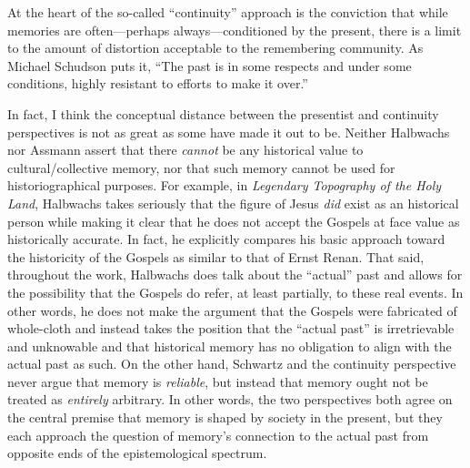 At the heart of the so-called ``continuity'' approach is the conviction
that while memories are often---perhaps always---conditioned by the
present, there is a limit to the amount of distortion acceptable to the
remembering community. As Michael Schudson puts it, ``The past is in
some respects and under some conditions, highly resistant to efforts to
make it over.''\autocite[107]{schudson_communication1989}

In fact, I think the conceptual distance between the presentist and
continuity perspectives is not as great as some have made it out to be.
Neither Halbwachs nor Assmann assert that there \emph{cannot} be any
historical value to cultural/collective memory, nor that such memory
cannot be used for historiographical purposes. For example, in
\emph{Legendary Topography of the Holy Land}, Halbwachs takes seriously
that the figure of Jesus \emph{did} exist as an historical person while
making it clear that he does not accept the Gospels at face value as
historically accurate. In fact, he explicitly compares his basic
approach toward the historicity of the Gospels as similar to that of
Ernst Renan. That said, throughout the work, Halbwachs does talk about
the ``actual'' past and allows for the possibility that the Gospels do
refer, at least partially, to these real events. In other words, he does
not make the argument that the Gospels were fabricated of whole-cloth
and instead takes the position that the ``actual past'' is irretrievable
and unknowable and that historical memory has no obligation to align
with the actual past as such. On the other hand, Schwartz and the
continuity perspective never argue that memory is \emph{reliable}, but
instead that memory ought not be treated as \emph{entirely} arbitrary.
In other words, the two perspectives both agree on the central premise
that memory is shaped by society in the present, but they each approach
the question of memory's connection to the actual past from opposite
ends of the epistemological spectrum.

